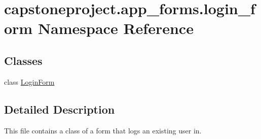 \hypertarget{namespacecapstoneproject_1_1app__forms_1_1login__form}{}\section{capstoneproject.\+app\+\_\+forms.\+login\+\_\+form Namespace Reference}
\label{namespacecapstoneproject_1_1app__forms_1_1login__form}
\subsection*{Classes}
\begin{DoxyCompactItemize}
\item 
class \mbox{\hyperlink{classcapstoneproject_1_1app__forms_1_1login__form_1_1_login_form}{Login\+Form}}
\end{DoxyCompactItemize}


\subsection{Detailed Description}
\begin{DoxyVerb}This file contains a class of a form that logs an existing user in.
\end{DoxyVerb}
 